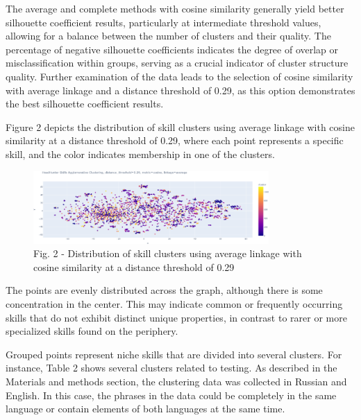\begin{multicols}{2}
The average and complete methods with cosine similarity generally yield
better silhouette coefficient results, particularly at intermediate
threshold values, allowing for a balance between the number of clusters
and their quality. The percentage of negative silhouette coefficients
indicates the degree of overlap or misclassification within groups,
serving as a crucial indicator of cluster structure quality. Further
examination of the data leads to the selection of cosine similarity with
average linkage and a distance threshold of 0.29, as this option
demonstrates the best silhouette coefficient results.

Figure 2 depicts the distribution of skill clusters using average
linkage with cosine similarity at a distance threshold of 0.29, where
each point represents a specific skill, and the color indicates
membership in one of the clusters.
\end{multicols}

\begin{figure}[H]
	\centering
	\includegraphics[width=0.8\textwidth]{media/ict/image105}
	\caption*{Fig. 2 - Distribution of skill clusters using average linkage
with cosine similarity at a distance threshold of 0.29}
\end{figure}

\begin{multicols}{2}
The points are evenly distributed across the graph, although there is
some concentration in the center. This may indicate common or frequently
occurring skills that do not exhibit distinct unique properties, in
contrast to rarer or more specialized skills found on the periphery.

Grouped points represent niche skills that are divided into several
clusters. For instance, Table 2 shows several clusters related to
testing. As described in the Materials and methods section, the
clustering data was collected in Russian and English. In this case, the
phrases in the data could be completely in the same language or contain
elements of both languages at the same time.
\end{multicols}


